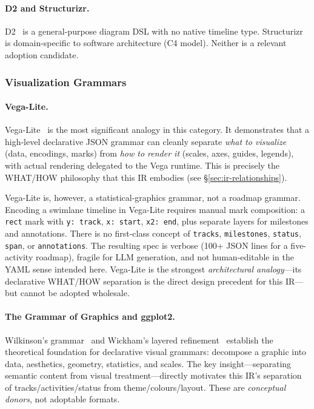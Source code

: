 \paragraph{D2 and Structurizr.}
D2~\cite{d2lang} is a general-purpose diagram DSL with no native timeline type.
Structurizr~\cite{structurizr} is domain-specific to software architecture (C4
model). Neither is a relevant adoption candidate.

\subsubsection{Visualization Grammars}

\paragraph{Vega-Lite.}
Vega-Lite~\cite{vegalite2017} is the most significant analogy in this
category. It demonstrates that a high-level declarative JSON grammar can
cleanly separate \emph{what to visualize} (data, encodings, marks) from
\emph{how to render it} (scales, axes, guides, legends), with actual rendering
delegated to the Vega runtime. This is precisely the WHAT/HOW philosophy that
this IR embodies (see \S\ref{sec:ir-relationships}).

Vega-Lite is, however, a statistical-graphics grammar, not a roadmap grammar.
Encoding a swimlane timeline in Vega-Lite requires manual mark composition:
a \texttt{rect} mark with \texttt{y: track}, \texttt{x: start},
\texttt{x2: end}, plus separate layers for milestones and annotations. There is
no first-class concept of \texttt{tracks}, \texttt{milestones}, \texttt{status},
\texttt{span}, or \texttt{annotations}. The resulting spec is verbose
(100{+} JSON lines for a five-activity roadmap), fragile for LLM generation,
and not human-editable in the YAML sense intended here. Vega-Lite is the
strongest \emph{architectural analogy}---its declarative WHAT/HOW separation is
the direct design precedent for this IR---but cannot be adopted wholesale.

\paragraph{The Grammar of Graphics and ggplot2.}
Wilkinson's grammar~\cite{grammarofgraphics2005} and Wickham's layered
refinement~\cite{layeredgrammar2010} establish the theoretical foundation for
declarative visual grammars: decompose a graphic into data, aesthetics,
geometry, statistics, and scales. The key insight---separating semantic content
from visual treatment---directly motivates this IR's separation of
tracks/activities/status from theme/colours/layout. These are
\emph{conceptual donors}, not adoptable formats.

